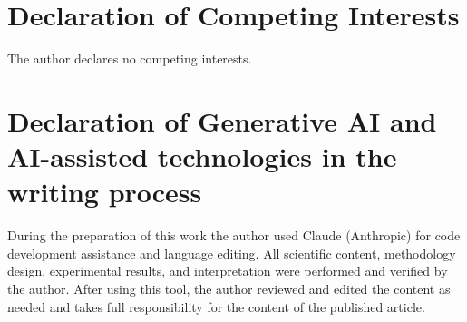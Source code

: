 \documentclass[1p,times]{elsarticle}
\begin{document}
\section*{Declaration of Competing Interests}

The author declares no competing interests.

\section*{Declaration of Generative AI and AI-assisted technologies in the writing process}

During the preparation of this work the author used Claude (Anthropic) for code development assistance and language editing. All scientific content, methodology design, experimental results, and interpretation were performed and verified by the author.
After using this tool, the author reviewed and edited the content as needed and takes full responsibility for the content of the published article.



\end{document}
